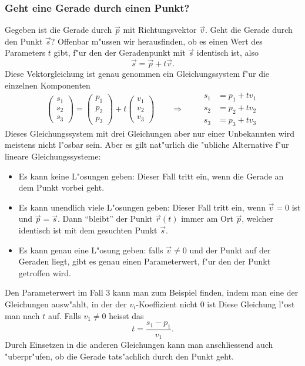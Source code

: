 \subsubsection{Geht eine Gerade durch einen Punkt?}
Gegeben ist die Gerade durch $\vec p$ mit Richtungsvektor $\vec v$.
Geht die
Gerade durch den Punkt $\vec s$? Offenbar m"ussen wir herausfinden, ob es
einen Wert des Parameters $t$ gibt, f"ur den der Geradenpunkt mit $\vec s$
identisch ist, also
\[
\vec s = \vec p + t\vec v.
\]
Diese Vektorgleichung ist genau genommen ein Gleichungssystem f"ur die einzelnen
Komponenten
\[
\begin{pmatrix}
s_1\\s_2\\s_3
\end{pmatrix}
=
\begin{pmatrix}
p_1\\p_2\\p_3
\end{pmatrix}
+t
\begin{pmatrix}
v_1\\v_2\\v_3
\end{pmatrix}
\qquad
\Rightarrow
\qquad
\begin{aligned}
s_1&=p_1+tv_1\\
s_2&=p_2+tv_2\\
s_3&=p_3+tv_3
\end{aligned}
\]
Dieses Gleichungssystem mit drei Gleichungen aber nur einer Unbekannten wird
meistens nicht l"osbar sein.
Aber es gilt nat"urlich die "ubliche Alternative
f"ur lineare Gleichungssysteme:
\begin{itemize}
\item Es kann keine L"osungen geben: Dieser Fall tritt ein, wenn die Gerade
an dem Punkt vorbei geht.
\item Es kann unendlich viele L"osungen geben: Dieser Fall tritt ein, wenn
$\vec v=0$ ist und $\vec p=\vec s$.
Dann ``bleibt'' der Punkt $\vec r(t)$
immer am Ort $\vec p$, welcher identisch ist mit dem gesuchten Punkt $\vec s$.
\item Es kann genau eine L"osung geben: falls $\vec v\ne 0$ und der Punkt auf der
Geraden liegt, gibt es genau einen Parameterwert, f"ur den der Punkt
getroffen wird.
\end{itemize}
Den Parameterwert im Fall 3 kann man zum Beispiel finden, indem man eine
der Gleichungen ausw"ahlt, in der der $v_i$-Koeffizient nicht $0$ ist
Diese Gleichung l"ost man nach $t$ auf.
Falls $v_1\ne 0$ heisst das
\[
t=\frac{s_1-p_1}{v_1}.
\]
Durch Einsetzen in die anderen Gleichungen kann man anschliessend auch "uberpr"ufen,
ob die Gerade tats"achlich durch den Punkt geht.

